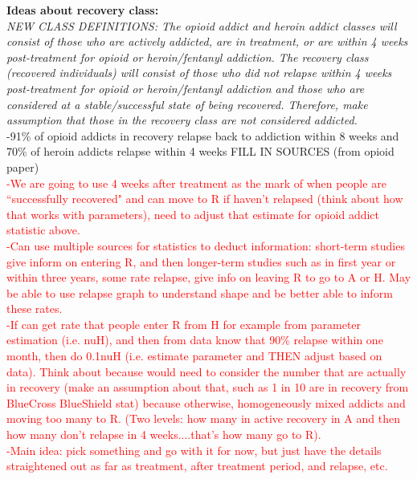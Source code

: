 \documentclass[12pt]{article}
\begin{document}
\noindent \textbf{Ideas about recovery class:} \\ 

\textit{NEW CLASS DEFINITIONS: The opioid addict and heroin addict classes will consist of those who are actively addicted, are in treatment, or are within 4 weeks post-treatment for opioid or heroin/fentanyl addiction. The recovery class (recovered individuals) will consist of those who did not relapse within 4 weeks post-treatment for opioid or heroin/fentanyl addiction and those who are considered at a stable/successful state of being recovered. Therefore, make assumption that those in the recovery class are not considered addicted.}\\

-91\% of opioid addicts in recovery relapse back to addiction within 8 weeks and 70\% of heroin addicts relapse within 4 weeks FILL IN SOURCES (from opioid paper) \cite{NIH4, SAMSHA4} \\
\textcolor{red}{-We are going to use 4 weeks after treatment as the mark of when people are ``successfully recovered" and can move to R if haven't relapsed (think about how that works with parameters), need to adjust that estimate for opioid addict statistic above. \\
-Can use multiple sources for statistics to deduct information: short-term studies give inform on entering R, and then longer-term studies such as in first year or within three years, some rate relapse, give info on leaving R to go to A or H. May be able to use relapse graph to understand shape and be better able to inform these rates. \\
-If can get rate that people enter R from H for example from parameter estimation (i.e. nuH), and then from data know that 90\% relapse within one month, then do 0.1nuH (i.e. estimate parameter and THEN adjust based on data). Think about because would need to consider the number that are actually in recovery (make an assumption about that, such as 1 in 10 are in recovery from BlueCross BlueShield stat) because otherwise, homogeneously mixed addicts and moving too many to R. (Two levels: how many in active recovery in A and then how many don't relapse in 4 weeks....that's how many go to R). \\
-Main idea: pick something and go with it for now, but just have the details straightened out as far as treatment, after treatment period, and relapse, etc.}
\end{document}
